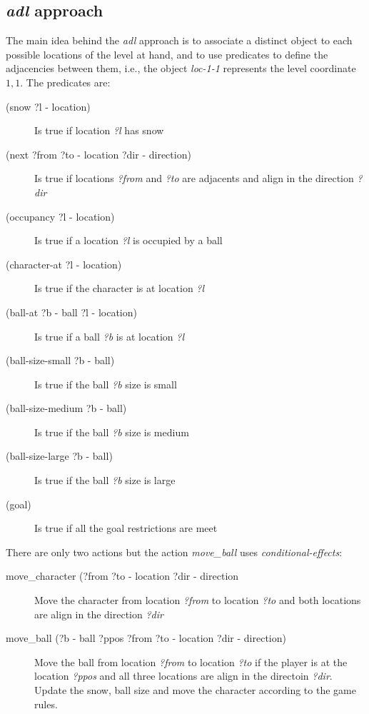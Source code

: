 \documentclass{report}
\theoremstyle{plain}
\begin{document}
\subsection{\emph{adl} approach}
The main idea behind the \emph{adl} approach is to associate a distinct object to each possible locations of the level at hand, and to use predicates to define the adjacencies between them, i.e., the object \textit{loc-1-1} represents the level coordinate $1,1$. The predicates are:

\begin{description}
    \item[(snow ?l - location)] Is true if location \textit{?l} has snow
    \item[(next ?from ?to - location ?dir - direction)] Is true if locations \textit{?from} and \textit{?to} are adjacents and align in the direction \textit{?dir}
    \item[(occupancy ?l - location)] Is true if a location \textit{?l} is occupied by a ball
    \item[(character-at ?l - location)] Is true if the character is at location \textit{?l}
    \item[(ball-at ?b - ball ?l - location)] Is true if a ball \textit{?b} is at location \textit{?l}
    \item[(ball-size-small ?b - ball)] Is true if the ball \textit{?b} size is small
    \item[(ball-size-medium ?b - ball)] Is true if the ball \textit{?b} size is medium
    \item[(ball-size-large ?b - ball)] Is true if the ball \textit{?b} size is large
    \item[(goal)] Is true if all the goal restrictions are meet
\end{description}

There are only two actions but the action \emph{move\_ball} uses \emph{conditional-effects}:
\begin{description}
    \item[move\_character (?from ?to - location ?dir - direction] Move the character from location \textit{?from} to location \textit{?to} and both locations are align in the direction \textit{?dir}
    \item[move\_ball (?b - ball ?ppos ?from ?to - location ?dir - direction)] Move the ball from location \textit{?from} to location \textit{?to} if the player is at the location \textit{?ppos} and all three locations are align in the directoin \textit{?dir}. Update the snow, ball size and move the character according to the game rules.
\end{description}
\end{document}
